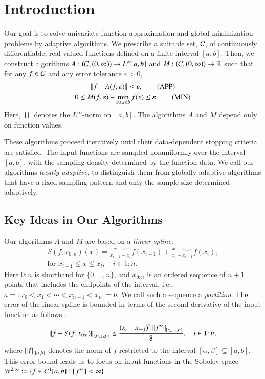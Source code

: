 \documentclass[review]{elsarticle}
\newcommand{\abstol}{\varepsilon}
\newcommand{\oton}{1\!:\!n}
\newcommand{\datasites}{x_{0:n}}
\theoremstyle{definition}
\renewcommand{\cw}{W}
\begin{document}
\section{Introduction} \label{sec:intro}

Our goal is to solve univariate function approximation and global minimization
problems by adaptive algorithms. We prescribe a suitable set, $\cc$, of continuously
differentiable, real-valued functions defined on a finite interval $[a,b]$.  Then, we
construct algorithms $A:(\cc,(0,\infty)) \to L^{\infty}[a,b]$ and $M:
(\cc,(0,\infty)) \to \reals$ such that for any $f \in \cc$ and any error
tolerance $\abstol > 0$,
\begin{gather} \norm{f - A(f,\abstol)} \le \abstol,
\tag{APP} \label{appxprob} \\
0 \le M(f,\abstol) - \min_{a \le x \le b} f(x) \le
\abstol. \tag{MIN} \label{optprob}
\end{gather}
Here, $\norm{\cdot}$ denotes the
$L^{\infty}$-norm on $[a,b]$. The algorithms $A$ and $M$ depend only on function
values.

These algorithms proceed iteratively until their data-dependent stopping
criteria are satisfied. The input functions are sampled nonuniformly over
the interval $[a,b]$, with the sampling density determined by the function data.
We call our algorithms \emph{locally adaptive}, to distinguish them from
globally adaptive algorithms that have a fixed sampling pattern and only the
sample size determined adaptively.

\subsection{Key Ideas in Our Algorithms} \label{subsec:keyideas}

Our algorithms $A$ and $M$ are based on a \emph{linear spline}:
\begin{multline} \label{splinedef}
   S(f,\datasites)(x) =
   \frac{x-x_i}{x_{i-1} - x_i} f(x_{i-1}) + \frac{x-x_{i-1}}{x_{i} - x_{i-1}}f(x_i),
\\ \text{for } x_{i-1} \le x \le x_i, \quad i \in \oton.
\end{multline}
Here ${0\!:\!n}$ is shorthand for $\{0, \ldots, n\}$, and $\datasites$ is an
ordered sequence of $n+1$ points that includes the endpoints of the interval,
i.e., $a=:x_0 <x_1 < \cdots < x_{n-1} < x_{n}:=b$. We call such a sequence a
\emph{partition}. The error of the linear spline is bounded in terms
of the second derivative of the input function as follows \cite[Theorem
3.3]{BurFaiBur16a}:
\begin{equation} \label{appxerrbda}
	\norm[{[x_{i-1},x_i]}]{f - S(f,\datasites)}
	\le \frac{(x_i - x_{i-1})^2\norm[{[x_{i-1},x_i]}]{f''}}{8}, \quad i \in \oton,
\end{equation}
where $\norm[{[\alpha,\beta]}]{f}$ denotes the norm of $f$ restricted to the
interval $[\alpha,\beta] \subseteq [a,b]$. This error bound leads us to focus on
input functions in the Sobolev space $\cw^{2,\infty} := \{f \in C^1[a,b] :
\norm{f''} < \infty \}$.
\end{document}
